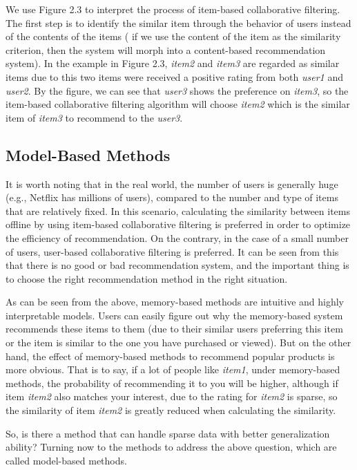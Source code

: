 We use Figure 2.3 to interpret the process of item-based collaborative filtering. The first step is to identify the similar item through the behavior of users instead of the contents of the items ( if we use the content of the item as the similarity criterion, then the system will morph into a content-based recommendation system). In the example in Figure 2.3, \textit{item2} and \textit{item3} are regarded as similar items due to this two items were received a positive rating from both \textit{user1} and \textit{user2}. By the figure, we can see that \textit{user3} shows the preference on \textit{item3}, so the item-based collaborative filtering algorithm will choose \textit{item2} which is the similar item of \textit{item3} to recommend to the \textit{user3}.
\subsection{Model-Based Methods}
It is worth noting that in the real world, the number of users is generally huge (e.g., Netflix has millions of users), compared to the number and type of items that are relatively fixed. In this scenario, calculating the similarity between items offline by using item-based collaborative filtering is preferred in order to optimize the efficiency of recommendation. On the contrary, in the case of a small number of users, user-based collaborative filtering is preferred. It can be seen from this that there is no good or bad recommendation system, and the important thing is to choose the right recommendation method in the right situation.

As can be seen from the above, memory-based methods are intuitive and highly interpretable models. Users can easily figure out why the memory-based system recommends these items to them (due to their similar users preferring this item or the item is similar to the one you have purchased or viewed). But on the other hand, the effect of memory-based methods to recommend popular products is more obvious. That is to say, if a lot of people like \textit{item1}, under memory-based methods, the probability of recommending it to you will be higher, although if item \textit{item2} also matches your interest, due to the rating for \textit{item2} is sparse, so the similarity of item \textit{item2} is greatly reduced when calculating the similarity.

So, is there a method that can handle sparse data with better generalization ability? Turning now to the methods to address the above question, which are called model-based methods.
